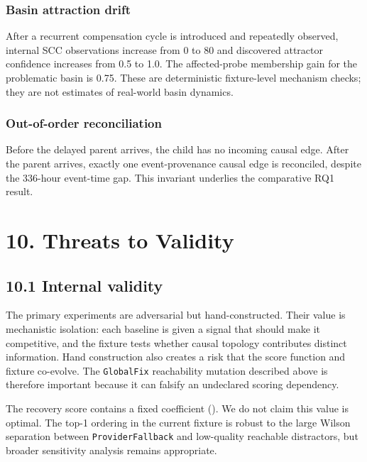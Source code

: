 \documentclass[
  11pt,
]{article}
\begin{document}
\subsubsection{Basin attraction drift}\label{basin-attraction-drift}

After a recurrent compensation cycle is introduced and repeatedly
observed, internal SCC observations increase from 0 to 80 and discovered
attractor confidence increases from 0.5 to 1.0. The affected-probe
membership gain for the problematic basin is 0.75. These are
deterministic fixture-level mechanism checks; they are not estimates of
real-world basin dynamics.

\subsubsection{Out-of-order
reconciliation}\label{out-of-order-reconciliation}

Before the delayed parent arrives, the child has no incoming causal
edge. After the parent arrives, exactly one event-provenance causal edge
is reconciled, despite the 336-hour event-time gap. This invariant
underlies the comparative RQ1 result.

\section{10. Threats to Validity}\label{threats-to-validity}

\subsection{10.1 Internal validity}\label{internal-validity}

The primary experiments are adversarial but hand-constructed. Their
value is mechanistic isolation: each baseline is given a signal that
should make it competitive, and the fixture tests whether causal
topology contributes distinct information. Hand construction also
creates a risk that the score function and fixture co-evolve. The
\texttt{GlobalFix} reachability mutation described above is therefore
important because it can falsify an undeclared scoring dependency.

The recovery score contains a fixed coefficient (). We do
not claim this value is optimal. The top-1 ordering in the current
fixture is robust to the large Wilson separation between
\texttt{ProviderFallback} and low-quality reachable distractors, but
broader sensitivity analysis remains appropriate.
\end{document}
